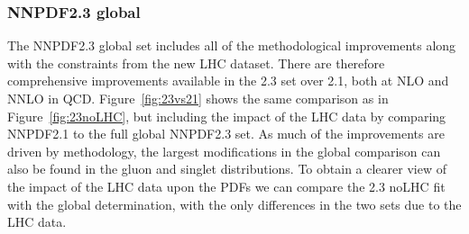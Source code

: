 \subsubsection{NNPDF2.3 global}

The NNPDF2.3 global set includes all of the methodological improvements along with the constraints from the new LHC dataset. There are therefore comprehensive improvements available in the 2.3 set over 2.1, both at NLO and NNLO in QCD. Figure~\ref{fig:23vs21} shows the same comparison as in Figure~\ref{fig:23noLHC}, but including the impact of the LHC data by comparing NNPDF2.1 to the full global NNPDF2.3 set. As much of the improvements are driven by methodology, the largest modifications in the global comparison can also be found in the gluon and singlet distributions. To obtain a clearer view of the impact of the LHC data upon the PDFs we can compare the 2.3 noLHC fit with the global determination, with the only differences in the two sets due to the LHC data. 

